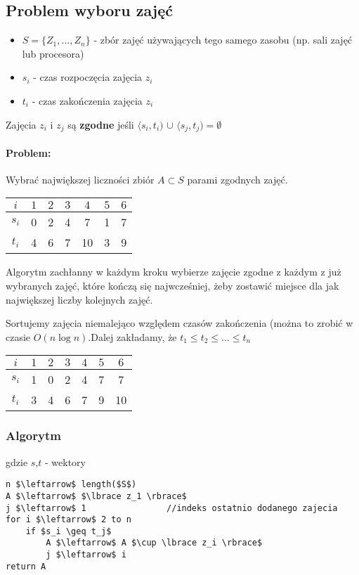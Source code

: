 \subsection{Problem wyboru zajęć}
\begin{itemize}
\item $S = \{ Z_1,...,Z_n \}$ - zbór zajęć używających tego samego zasobu (np. sali zajęć lub procesora) 
\item $s_i$ - czas rozpoczęcia zajęcia $z_i$
\item $t_i$ - czas zakończenia zajęcia $z_i$
\end{itemize}
Zajęcia $z_i$ i $z_j$ są \textbf{zgodne} jeśli $\langle s_i,t_i)$ $\cup$ $\langle s_j,t_j) = \emptyset$
\paragraph{Problem:}{ Wybrać największej liczności zbiór $A \subset S$ parami zgodnych zajęć.}
\begin{center}
\begin{tabular}{ c | c | c | c | c | c | c }
  $i$ & $1$	& $2$ & $3$ & $4$ & $5$ & $6$ \\ \hline
  $s_i$ & 0	&  2  & 4 	& 7 & 1 & 7 \\ \hline
  $t_i$ & 4	&  6  & 7 	& 10 & 3 & 9 \\  
\end{tabular}
\end{center}

Algorytm zachłanny w każdym kroku wybierze zajęcie zgodne z każdym z już wybranych zajęć, które kończą się najwcześniej, żeby zostawić miejsce dla jak największej liczby kolejnych zajęć.

Sortujemy zajęcia niemalejąco względem czasów zakończenia (można to zrobić w czasie $O(n \log n)$.Dalej zakładamy, że $t_1 \leq t_2 \leq ... \leq t_n$

\begin{center}
\begin{tabular}{ c | c | c | c | c | c | c }
  $i$ & $1$	& $2$ & $3$ & $4$ & $5$ & $6$ \\ \hline
  $s_i$ & 1	&  0  &  2	&  4  &  7  & 7 \\ \hline
  $t_i$ & 3	&  4  &  6	&  7  &  9  & 10 \\  
\end{tabular}
\end{center}

\subsubsection{Algorytm}
gdzie $s$,$t$ - wektory
\begin{lstlisting}
n $\leftarrow$ length($S$)
A $\leftarrow$ $\lbrace z_1 \rbrace$
j $\leftarrow$ 1				//indeks ostatnio dodanego zajecia
for i $\leftarrow$ 2 to n
	if $s_i \geq t_j$ 
    	A $\leftarrow$ A $\cup \lbrace z_i \rbrace$
    	j $\leftarrow$ i
return A
\end{lstlisting}

